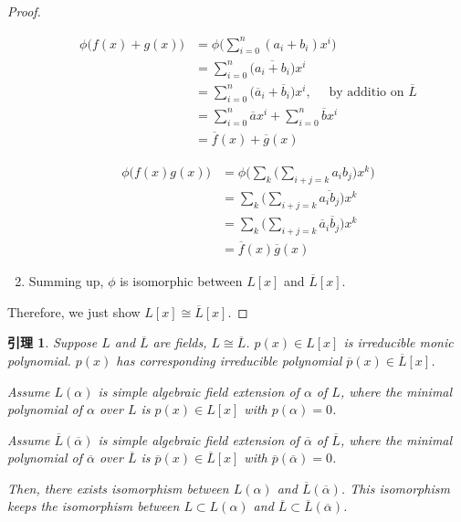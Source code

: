 \documentclass[utf8]{ctexbook}
\newtheorem{lemma}{引理}[section]
\begin{document}
\begin{proof}
\begin{enumerate}
{\begin{align*}
\phi \big(f(x) + g(x) \big) &= \phi\big( \sum_{i=0} ^n (a_i + b_i) x^i   \big) \\
&= \sum_{i=0} ^n \big( \overline{a_i + b_i} \big) x^i \\
&=  \sum_{i=0} ^n \big( \overline{a}_i + \overline{b}_i \big) x^i , \quad  \mbox{ by additio on $\overline{L}$} \\
&= \sum_{i=0} ^n \overline{a} x^i + \sum_{i=0} ^n \overline{b} x^i  \\
&= \overline{f} (x) + \overline{g} (x)
\end{align*} 

\begin{align*}
\phi\big( f(x) g(x) \big) &= \phi \big( \sum_k \big( \sum_{i+j = k} a_i b_j \big) x^k \big) \\
&= \sum_k \big( \sum_{i+j = k} \overline{a_i b_j } \big) x^k \\
&= \sum_k \big( \sum_{i+j = k} \overline{a}_i \overline{b}_j  \big) x^k \\
& = \overline{f}(x) \overline{g}(x)
\end{align*}
}
\item{Summing up, $\phi$ is isomorphic between $L[x]$ and $\overline{L}[x]$.}
\end{enumerate}

Therefore, we just show $L[x] \cong \overline{L}[x]$.

\end{proof}

\begin{lemma}
\label{lemma_4_4_2_simple_extension_field_iso}
Suppose $L$ and $\overline{L}$ are fields, $ L \cong \overline{L}$. $p(x) \in L[x]$ is irreducible monic polynomial. $p(x)$ has corresponding irreducible polynomial $\overline{p}(x) \in \overline{L}[x] $.

Assume $L(\alpha)$ is simple algebraic field extension of $\alpha$ of $L$, where the minimal polynomial of $\alpha$ over $L$ is $p(x) \in L[x] $ with $p(\alpha)=0$.

Assume $\overline{L}( \overline{\alpha} )$ is simple algebraic field extension of $\overline{\alpha}$ of $\overline{L}$, where the minimal polynomial of $\overline{\alpha}$ over $\overline{L}$ is $\overline{p}(x) \in \overline{L} [x] $ with $\overline{p} ( \overline{\alpha})=0$.

Then, there exists isomorphism between $L(\alpha)$ and $\overline{L} (\overline{\alpha})$. This isomorphism keeps the isomorphism between $L \subset L(\alpha)$ and $\overline{L} \subset \overline{L}(\overline{\alpha})$.

\end{lemma}
\end{document}
